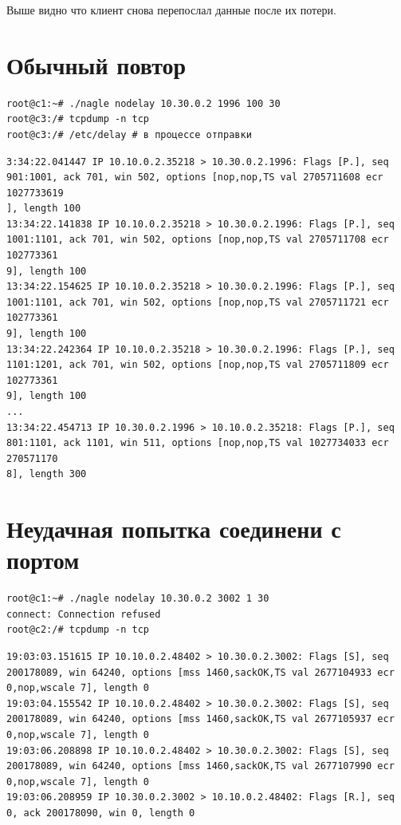 \documentclass[a4paper,12pt]{article}
\begin{document}
Выше видно что клиент снова перепослал данные после их потери.

\section{Обычный повтор}

\begin{Verbatim}
root@c1:~# ./nagle nodelay 10.30.0.2 1996 100 30
root@c3:/# tcpdump -n tcp
root@c3:/# /etc/delay # в процессе отправки
\end{Verbatim}

\begin{Verbatim}
3:34:22.041447 IP 10.10.0.2.35218 > 10.30.0.2.1996: Flags [P.], seq 901:1001, ack 701, win 502, options [nop,nop,TS val 2705711608 ecr 1027733619
], length 100
13:34:22.141838 IP 10.10.0.2.35218 > 10.30.0.2.1996: Flags [P.], seq 1001:1101, ack 701, win 502, options [nop,nop,TS val 2705711708 ecr 102773361
9], length 100
13:34:22.154625 IP 10.10.0.2.35218 > 10.30.0.2.1996: Flags [P.], seq 1001:1101, ack 701, win 502, options [nop,nop,TS val 2705711721 ecr 102773361
9], length 100
13:34:22.242364 IP 10.10.0.2.35218 > 10.30.0.2.1996: Flags [P.], seq 1101:1201, ack 701, win 502, options [nop,nop,TS val 2705711809 ecr 102773361
9], length 100
...
13:34:22.454713 IP 10.30.0.2.1996 > 10.10.0.2.35218: Flags [P.], seq 801:1101, ack 1101, win 511, options [nop,nop,TS val 1027734033 ecr 270571170
8], length 300
\end{Verbatim}

\section{Неудачная попытка соединени с портом}

\begin{Verbatim}
root@c1:~# ./nagle nodelay 10.30.0.2 3002 1 30
connect: Connection refused
root@c2:/# tcpdump -n tcp
\end{Verbatim}

\begin{Verbatim}
19:03:03.151615 IP 10.10.0.2.48402 > 10.30.0.2.3002: Flags [S], seq 200178089, win 64240, options [mss 1460,sackOK,TS val 2677104933 ecr 0,nop,wscale 7], length 0
19:03:04.155542 IP 10.10.0.2.48402 > 10.30.0.2.3002: Flags [S], seq 200178089, win 64240, options [mss 1460,sackOK,TS val 2677105937 ecr 0,nop,wscale 7], length 0
19:03:06.208898 IP 10.10.0.2.48402 > 10.30.0.2.3002: Flags [S], seq 200178089, win 64240, options [mss 1460,sackOK,TS val 2677107990 ecr 0,nop,wscale 7], length 0
19:03:06.208959 IP 10.30.0.2.3002 > 10.10.0.2.48402: Flags [R.], seq 0, ack 200178090, win 0, length 0
\end{Verbatim}
\end{document}
